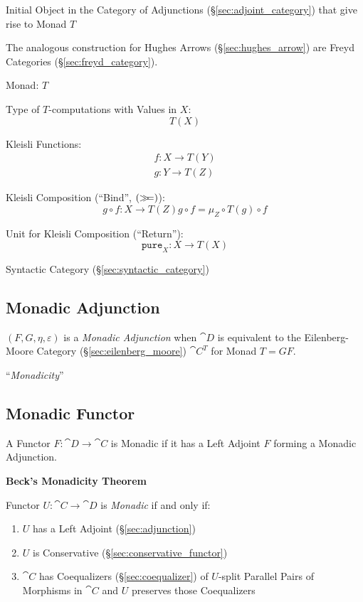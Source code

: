 Initial Object in the Category of Adjunctions
(\S\ref{sec:adjoint_category}) that give rise to Monad $T$

The analogous construction for Hughes Arrows
(\S\ref{sec:hughes_arrow}) are Freyd Categories
(\S\ref{sec:freyd_category}).

Monad: $T$

Type of $T$-computations with Values in $X$:
\[
  T (X)
\]

Kleisli Functions:
\[
\begin{split}
  f : X \rightarrow T(Y) \\
  g : Y \rightarrow T(Z)
\end{split}
\]

Kleisli Composition (``Bind'', $\mathtt{(\mathsf{\gg\kern-3pt=})}$):
\[
  g \circ f : X \rightarrow T(Z)
  g \circ f = \mu_Z \circ T(g) \circ f
\]

Unit for Kleisli Composition (``Return''):
\[
  \mathtt{pure}_X : X \rightarrow T (X)
\]

Syntactic Category (\S\ref{sec:syntactic_category})



\subsection{Monadic Adjunction}\label{sec:monadic_adjunction}

$(F,G,\eta,\varepsilon)$ is a \emph{Monadic Adjunction} when
$\cat{D}$ is equivalent to the Eilenberg-Moore Category
(\S\ref{sec:eilenberg_moore}) $\cat{C}^T$ for Monad $T = GF$.

``\emph{Monadicity}''



\subsection{Monadic Functor}\label{sec:monadic_functor}

A Functor $F : \cat{D} \rightarrow \cat{C}$ is Monadic if it has
a Left Adjoint $F$ forming a Monadic Adjunction.

\textbf{Beck's Monadicity Theorem}

Functor $U : \cat{C} \rightarrow \cat{D}$ is \emph{Monadic} if
and only if:
\begin{enumerate}
  \item $U$ has a Left Adjoint (\S\ref{sec:adjunction})
  \item $U$ is Conservative (\S\ref{sec:conservative_functor})
  \item $\cat{C}$ has Coequalizers (\S\ref{sec:coequalizer}) of
    $U$-split Parallel Pairs of Morphisms in $\cat{C}$ and $U$
    preserves those Coequalizers
\end{enumerate}

